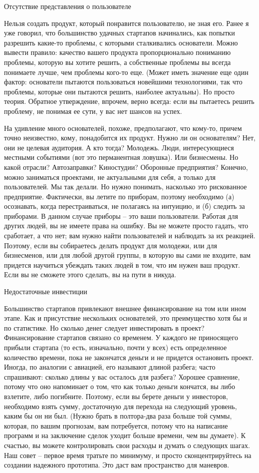 \documentclass[ebook,12pt,oneside,openany]{memoir}
\begin{document}
Отсутствие представления о пользователе

Нельзя создать продукт, который понравится пользователю, не зная его.
Ранее я уже говорил, что большинство удачных стартапов начинались, как
попытки разрешить какие-то проблемы, с которыми сталкивались
основатели. Можно вывести правило: качество вашего продукта
пропорционально пониманию проблемы, которую вы хотите решить, а
собственные проблемы вы всегда понимаете лучше, чем проблемы кого-то
еще. (Может иметь значение еще один фактор: основатели пытаются
пользоваться новейшими технологиями, так что проблемы, которые они
пытаются решить, наиболее актуальны). Но просто теория. Обратное
утверждение, впрочем, верно всегда: если вы пытаетесь решить проблему,
не понимая ее сути, у вас нет шансов на успех.

На удивление много основателей, похоже, предполагают, что кому-то,
причем точно неизвестно, кому, понадобится их продукт. Нужно ли он
основателям? Нет, они не целевая аудитория. А кто тогда? Молодежь.
Люди, интересующиеся местными событиями (вот это перманентная
ловушка). Или бизнесмены. Но какой отрасли? Автозаправки? Киностудии?
Оборонные предприятия? Конечно, можно заниматься проектами, не
актуальными для себя, а только для пользователей. Мы так делали. Но
нужно понимать, насколько это рискованное предприятие. Фактически, вы
летите по приборам, поэтому необходимо (а) осознавать, когда
перестраиваться, не полагаясь на интуицию, и (б) следить за приборами.
В данном случае приборы – это ваши пользователи. Работая для других
людей, вы не имеете права на ошибку. Вы не можете просто гадать, что
сработает, а что нет; вам нужно найти пользователей и наблюдать за их
реакцией. Поэтому, если вы собираетесь делать продукт для молодежи,
или для бизнесменов, или для любой другой группы, в которую вы сами не
входите, вам придется научиться убеждать таких людей в том, что им
нужен ваш продукт. Если вы не сможете этого сделать, вы на пути в
никуда.

Недостаточные инвестиции

Большинство стартапов привлекают внешнее финансирование на том или
ином этапе. Как и присутствие нескольких основателей, это преимущество
хотя бы и по статистике. Но сколько денег следует инвестировать в
проект? Финансирование стартапов связано со временем. У каждого не
приносящего прибыли стартапа (то есть, изначально, почти у всех) есть
определенное количество времени, пока не закончатся деньги и не
придется остановить проект. Иногда, по аналогии с авиацией, его
называют длиной разбега; часто спрашивают: сколько длины у вас
осталось для разбега? Хорошее сравнение, потому что оно напоминает о
том, что как только деньги кончатся, вы либо взлетите, либо погибните.
Поэтому, если вы берете деньги у инвесторов, необходимо взять сумму,
достаточную для перехода на следующий уровень, каким бы он ни был.
(Нужно брать в полтора-два раза больше той суммы, которая, по вашим
прогнозам, вам потребуется, потому что на написание программ и на
заключение сделок уходит больше времени, чем вы думаете). К счастью,
вы можете контролировать свои расходы и думать о следующих шагах. Наш
совет – первое время тратьте по минимуму, и просто сконцентрируйтесь
на создании надежного прототипа. Это даст вам пространство для
маневров.
\end{document}
